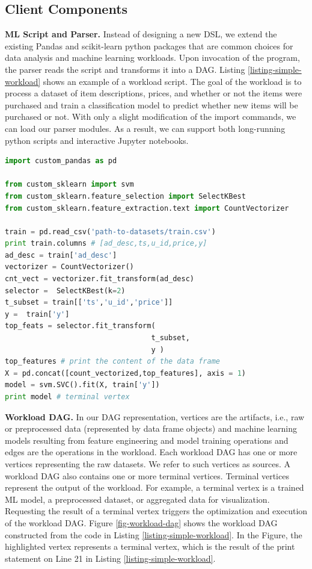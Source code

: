 \subsection{Client Components}
\textbf{ML Script and Parser.}
Instead of designing a new DSL, we extend the existing Pandas and scikit-learn \cite{sklearn_api} python packages that are common choices for data analysis and machine learning workloads.
Upon invocation of the program, the parser reads the script and transforms it into a DAG.
Listing \ref{listing-simple-workload} shows an example of a workload script.
The goal of the workload is to process a dataset of item descriptions, prices, and whether or not the items were purchased and train a classification model to predict whether new items will be purchased or not.
With only a slight modification of the import commands, we can load our parser modules.
As a result, we can support both long-running python scripts and interactive Jupyter notebooks.
\begin{lstlisting}[language=Python, caption=Example script,captionpos=b,label = {listing-simple-workload}]
import custom_pandas as pd

from custom_sklearn import svm
from custom_sklearn.feature_selection import SelectKBest
from custom_sklearn.feature_extraction.text import CountVectorizer

train = pd.read_csv('path-to-datasets/train.csv') 
print train.columns # [ad_desc,ts,u_id,price,y]
ad_desc = train['ad_desc']
vectorizer = CountVectorizer()
cnt_vect = vectorizer.fit_transform(ad_desc)
selector =  SelectKBest(k=2)
t_subset = train[['ts','u_id','price']]
y =  train['y']
top_feats = selector.fit_transform(
                                  t_subset,  
                                  y )
top_features # print the content of the data frame		     
X = pd.concat([count_vectorized,top_features], axis = 1)
model = svm.SVC().fit(X, train['y'])
print model # terminal vertex
\end{lstlisting}

\textbf{Workload DAG.}
In our DAG representation, vertices are the artifacts, i.e., raw or preprocessed data (represented by data frame objects) and machine learning models resulting from feature engineering and model training operations and edges are the operations in the workload.
Each workload DAG has one or more vertices representing the raw datasets.
We refer to such vertices as sources.
A workload DAG also contains one or more terminal vertices.
Terminal vertices represent the output of the workload.
For example, a terminal vertex is a trained ML model, a preprocessed dataset, or aggregated data for visualization.
Requesting the result of a terminal vertex triggers the optimization and execution of the workload DAG.
Figure \ref{fig-workload-dag} shows the workload DAG constructed from the code in Listing \ref{listing-simple-workload}.
In the Figure, the highlighted vertex represents a terminal vertex, which is the result of the print statement on Line 21 in Listing \ref{listing-simple-workload}.

